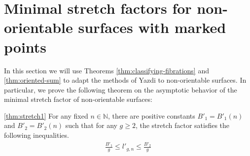 \section{Minimal stretch factors for non-orientable surfaces with marked points}
\label{sec:application}

In this section we will use Theorems \ref{thm:classifying-fibrations} and \ref{thm:oriented-sum} to adapt the methods of Yazdi \cite{yazdi2018pseudo} to non-orientable surfaces. In particular, we prove the following theorem on the asymptotic behavior of the minimal stretch factor of non-orientable surfaces:
\begin{manualtheorem}
  {\ref{thm:stretch1}}
  For any fixed $n \in \mathbb{N}$, there are positive constants $B'_1 = B'_1(n)$ and $B'_2 = B'_2(n)$ such that
  for any $g \geq 2$, the stretch factor satisfies the following inequalities.
  \begin{align*}
    \frac{B'_1}{g} \leq l'_{g,n} \leq \frac{B'_2}{g}
  \end{align*}
\end{manualtheorem}




